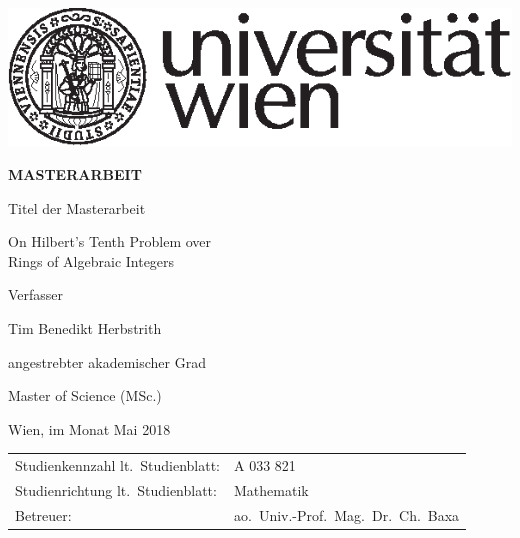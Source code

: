 
\begin{titlepage}
\begin{flushright}
    \includegraphics{uni-logo}
\end{flushright}
\vspace{0.5cm}

\begin{center}  %
    \Huge{\textsf{\textbf{\MakeUppercase{
        Masterarbeit
    }}}}
    \vspace{1.5cm}

    \large{\textsf{  %
        Titel der Masterarbeit
    }}
    \vspace{.1cm}

    \LARGE{\textsf{ On Hilbert's Tenth Problem over\\
                    Rings of Algebraic Integers
    }}
    \vfill

    \large{\textsf{  %
        Verfasser
    }}

    \Large{\textsf{  Tim Benedikt Herbstrith
    }}
    \vfill

    \large{\textsf{
        angestrebter akademischer Grad  %
    }}

    \Large{\textsf{  %
        Master of Science (MSc.)
    }}

\vspace{1.5cm}

\noindent\textsf{Wien, im Monat Mai 2018}  %
\vfill

\noindent\begin{tabular}{@{}ll}
\textsf{Studienkennzahl lt.\ Studienblatt:}
&
\textsf{A 033 821}  %
\\
\textsf{Studienrichtung lt.\ Studienblatt:}
&
\textsf{Mathematik}  %
\\
\textsf{Betreuer: }
&
\textsf{ao.~Univ.-Prof.~Mag.~Dr.~Ch.~Baxa}  %
\end{tabular}
\end{center}
\end{titlepage}

